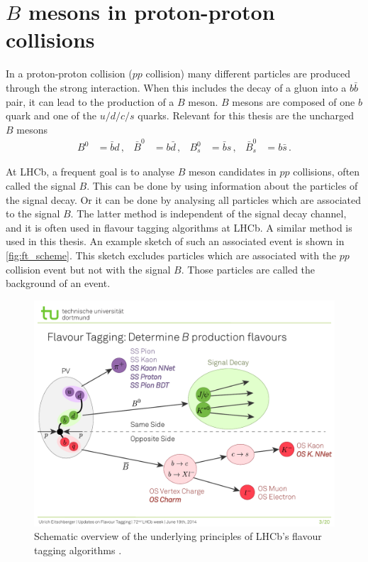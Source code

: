 \section{$B$ mesons in proton-proton collisions}

In a proton-proton collision ($pp$ collision) many different particles are produced through the strong interaction.
When this includes the decay of a gluon into a $b\bar{b}$ pair, it can lead to the production of a $B$ meson.
$B$ mesons are composed of one $b$ quark and one of the $u/d/c/s$ quarks.
Relevant for this thesis are the uncharged $B$ mesons
\begin{align*}
    B^0 &= \bar{b}d \, , & \bar{B}^0 &= b\bar{d} \, , & B_s^0 &= \bar{b}s \, , & \bar{B}_s^0 &= b\bar{s} \, .
\end{align*}

At LHCb, a frequent goal is to analyse $B$ meson candidates in $pp$ collisions, often called the signal $B$.
This can be done by using information about the particles of the signal decay. 
Or it can be done by analysing all particles which are associated to the signal $B$.
The latter method is independent of the signal decay channel, and it is often used in flavour tagging algorithms at LHCb. 
A similar method is used in this thesis.
An example sketch of such an associated event is shown in \autoref{fig:ft_scheme}. 
This sketch excludes particles which are associated with the $pp$ collision event but not with the signal $B$.
Those particles are called the background of an event.

\begin{figure}
    \centering
    \includegraphics[width=\textwidth]{images/FlavourTaggingScheme.pdf}
    \caption{Schematic overview of the underlying principles of LHCb's flavour tagging algorithms \cite{ft_scheme}.}
    \label{fig:ft_scheme}
\end{figure}

